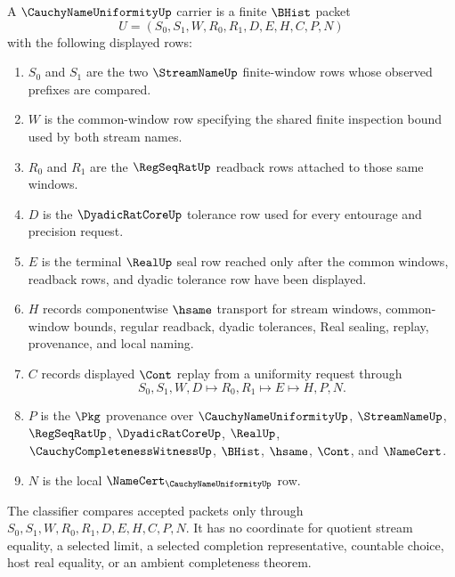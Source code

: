 \begin{definition}
\label{def:cauchy-name-uniformity-carrier}
A $\CauchyNameUniformityUp$ carrier is a finite $\BHist$ packet
$$
U=(S_0,S_1,W,R_0,R_1,D,E,H,C,P,N)
$$
with the following displayed rows:
\begin{enumerate}
\item $S_0$ and $S_1$ are the two $\StreamNameUp$ finite-window rows whose observed prefixes are compared.
\item $W$ is the common-window row specifying the shared finite inspection bound used by both stream names.
\item $R_0$ and $R_1$ are the $\RegSeqRatUp$ readback rows attached to those same windows.
\item $D$ is the $\DyadicRatCoreUp$ tolerance row used for every entourage and precision request.
\item $E$ is the terminal $\RealUp$ seal row reached only after the common windows, readback rows, and dyadic tolerance row have been displayed.
\item $H$ records componentwise $\hsame$ transport for stream windows, common-window bounds, regular readback, dyadic tolerances, Real sealing, replay, provenance, and local naming.
\item $C$ records displayed $\Cont$ replay from a uniformity request through
$$
S_0,S_1,W,D \longmapsto R_0,R_1 \longmapsto E \longmapsto H,P,N .
$$
\item $P$ is the $\Pkg$ provenance over $\CauchyNameUniformityUp$, $\StreamNameUp$, $\RegSeqRatUp$, $\DyadicRatCoreUp$, $\RealUp$, $\CauchyCompletenessWitnessUp$, $\BHist$, $\hsame$, $\Cont$, and $\NameCert$.
\item $N$ is the local $\NameCert_{\CauchyNameUniformityUp}$ row.
\end{enumerate}
The classifier compares accepted packets only through $S_0,S_1,W,R_0,R_1,D,E,H,C,P,N$. It has no coordinate for quotient stream equality, a selected limit, a selected completion representative, countable choice, host real equality, or an ambient completeness theorem.
\end{definition}

